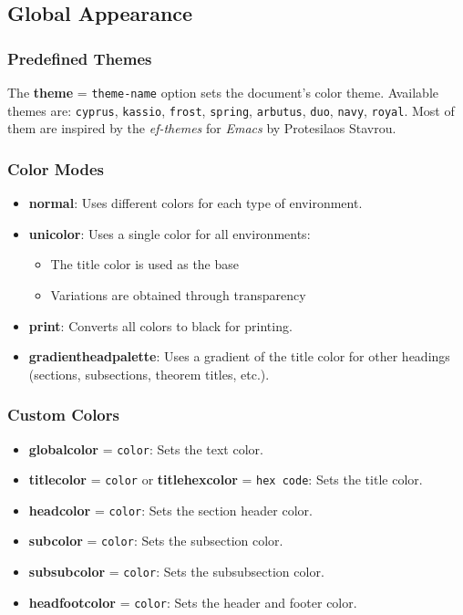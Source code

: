 \documentclass[
    margin=2cm
]{neoschool}
\begin{document}
\subsection{Global Appearance}

\subsubsection{Predefined Themes}

The \textbf{theme} = \texttt{theme-name} option sets the document's color theme.
Available themes are: \texttt{cyprus}, \texttt{kassio}, \texttt{frost},
\texttt{spring}, \texttt{arbutus}, \texttt{duo}, \texttt{navy}, \texttt{royal}.
Most of them are inspired by the \textit{ef-themes} for \textit{Emacs} by
Protesilaos Stavrou.

\subsubsection{Color Modes}

\begin{itemize}
\item
  \textbf{normal}: Uses different colors for each type of environment.
\item
  \textbf{unicolor}: Uses a single color for all environments:

  \begin{itemize}
    \item
    The title color is used as the base
  \item
    Variations are obtained through transparency
  \end{itemize}
\item
  \textbf{print}: Converts all colors to black for printing.
\item
  \textbf{gradientheadpalette}: Uses a gradient of the title color for
  other headings (sections, subsections, theorem titles, etc.).
\end{itemize}

\subsubsection{Custom Colors}

\begin{itemize}
\item
  \textbf{globalcolor} = \texttt{color}: Sets the text
  color.
\item
  \textbf{titlecolor} = \texttt{color} or
  \textbf{titlehexcolor} = \texttt{hex code}: Sets the
  title color.
\item
  \textbf{headcolor} = \texttt{color}: Sets the section
  header color.
\item
  \textbf{subcolor} = \texttt{color}: Sets the
  subsection color.
\item
  \textbf{subsubcolor} = \texttt{color}: Sets the
  subsubsection color.
\item
  \textbf{headfootcolor} = \texttt{color}: Sets the
  header and footer color.
\end{itemize}
\end{document}
